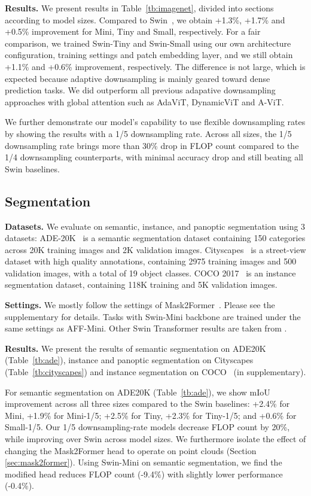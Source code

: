 \documentclass[10pt,twocolumn,letterpaper]{article}
\begin{document}
\noindent\textbf{Results.} We present results in Table~\ref{tb:imagenet}, divided into sections according to model sizes. 
Compared to Swin~\cite{swin}, we obtain +1.3\%, +1.7\% and +0.5\% improvement for Mini, Tiny and Small, respectively. For a fair comparison, we trained Swin-Tiny and Swin-Small using our own architecture configuration, training settings and patch embedding layer, and we still obtain +1.1\% and +0.6\% improvement, respectively. The difference is not large, which is expected because adaptive downsampling is mainly geared toward dense prediction tasks. We did outperform all previous adapative downsampling approaches with global attention such as AdaViT, DynamicViT and A-ViT.

We further demonstrate our model's capability to use flexible downsampling rates by showing the results with a 1/5 downsampling rate. Across all sizes, the 1/5 downsampling rate brings more than 30\% drop in FLOP count compared to the 1/4 downsampling counterparts, with minimal accuracy drop and still beating all Swin baselines.


\subsection{Segmentation}
\noindent\textbf{Datasets.} We evaluate on semantic, instance, and panoptic segmentation using 3 datasets: ADE-20K~\cite{ade} is a semantic segmentation dataset containing 150 categories across 20K training images and 2K validation images. Cityscapes~\cite{cityscapes} is a street-view dataset with high quality annotations, containing 2975 training images and 500 validation images, with a total of 19 object classes. COCO 2017~\cite{coco} is an instance segmentation dataset, containing 118K training and 5K validation images.

\noindent\textbf{Settings.} We mostly follow the settings of Mask2Former~\cite{mask2}. Please see the supplementary for details.
Tasks with Swin-Mini backbone are trained under the same settings as AFF-Mini. Other Swin Transformer results are taken from \cite{mask2}.



\noindent\textbf{Results.} We present the results of semantic segmentation on ADE20K~\cite{ade} (Table~\ref{tb:ade}), instance and panoptic segmentation on Cityscapes~\cite{cityscapes} (Table~\ref{tb:cityscapes}) and instance segmentation on  COCO~\cite{coco} (in supplementary).

For semantic segmentation on ADE20K (Table~\ref{tb:ade}), we show mIoU improvement across all three sizes compared to the Swin baselines: +2.4\% for Mini, +1.9\% for Mini-1/5; +2.5\% for Tiny, +2.3\% for Tiny-1/5; and +0.6\% for Small-1/5. Our 1/5 downsampling-rate models decrease FLOP count by 20\%, while improving over Swin across model sizes. We furthermore isolate the effect of changing the Mask2Former head to operate on point clouds (Section \ref{sec:mask2former}). Using Swin-Mini on semantic segmentation, we find the modified head reduces FLOP count (-9.4\%) with slightly lower  performance (-0.4\%).
\end{document}
